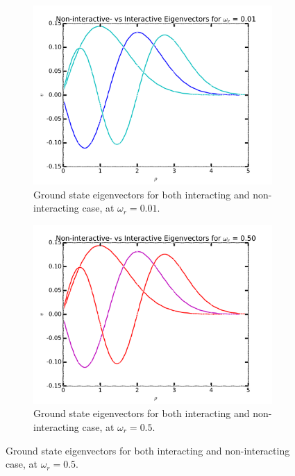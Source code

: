 \documentclass[11pt,a4paper,notitlepage]{article}
\begin{document}
\begin{figure}[H]
\center
    \begin{subfigure}[t]{0.45\textwidth}
        \includegraphics[scale=0.40]{../interacting_eigvecs_at_omega=10.png}
        \caption{Ground state eigenvectors for both interacting and non-interacting case, at $\omega_r = 0.01$.}\label{fig:eigvecs-interact10}
    \end{subfigure}
    \hfill
    \begin{subfigure}[t]{0.45\textwidth}
        \includegraphics[scale=0.40]{../interacting_eigvecs_at_omega=500.png}
        \caption{Ground state eigenvectors for both interacting and non-interacting case, at $\omega_r = 0.5$.}\label{fig:eigvecs-interact500}

\end{subfigure}
\end{figure}
\end{document}
